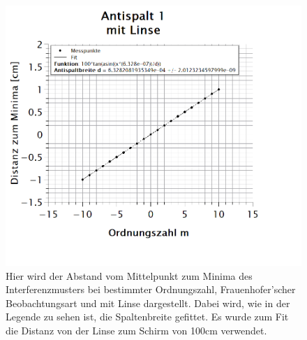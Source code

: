 \begin{figure}[h]
\centering
\includegraphics[width=\textwidth]{Bilder/antispalt1_mitLinse.png} 
\vspace*{-2cm}
\caption[Antispalt 1: mit Linse]{Hier wird der Abstand vom Mittelpunkt zum Minima des Interferenzmusters bei bestimmter Ordnungszahl, Frauenhofer'scher Beobachtungsart und mit Linse dargestellt. Dabei wird, wie in der Legende zu sehen ist, die Spaltenbreite gefittet. Es wurde zum Fit die Distanz von der Linse zum Schirm von 100cm verwendet.}
\label{fig:antispalt1_mitLinse}
\end{figure}
\newpage

